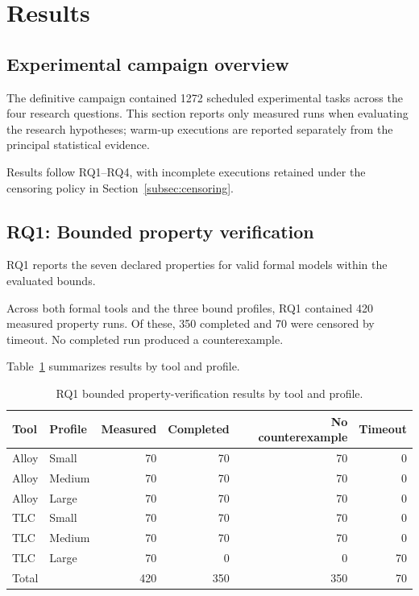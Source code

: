 \section{Results}
\label{sec:results}

\subsection{Experimental campaign overview}
\label{subsec:results-overview}

The definitive campaign contained 1272 scheduled experimental tasks
across the four research questions. This section reports only measured
runs when evaluating the research hypotheses; warm-up executions are
reported separately from the principal statistical evidence.

Results follow RQ1--RQ4, with incomplete executions retained under the
censoring policy in Section~\ref{subsec:censoring}.

\subsection{RQ1: Bounded property verification}
\label{subsec:rq1-results}

RQ1 reports the seven declared properties for valid formal models within
the evaluated bounds.

Across both formal tools and the three bound profiles, RQ1 contained
420 measured property runs. Of these, 350 completed and 70 were
censored by timeout. No completed run produced a counterexample.

Table~\ref{tab:rq1-summary} summarizes results by tool and profile.

\begin{table}[htbp]
\centering
\caption{RQ1 bounded property-verification results by tool and profile.}
\label{tab:rq1-summary}
\begin{tabular}{llrrrr}
\hline
Tool & Profile & Measured & Completed & No counterexample & Timeout \\
\hline
Alloy & Small  & 70 & 70 & 70 & 0  \\
Alloy & Medium & 70 & 70 & 70 & 0  \\
Alloy & Large  & 70 & 70 & 70 & 0  \\
TLC   & Small  & 70 & 70 & 70 & 0  \\
TLC   & Medium & 70 & 70 & 70 & 0  \\
TLC   & Large  & 70 & 0  & 0  & 70 \\
\hline
Total &        & 420 & 350 & 350 & 70 \\
\hline
\end{tabular}
\end{table}

